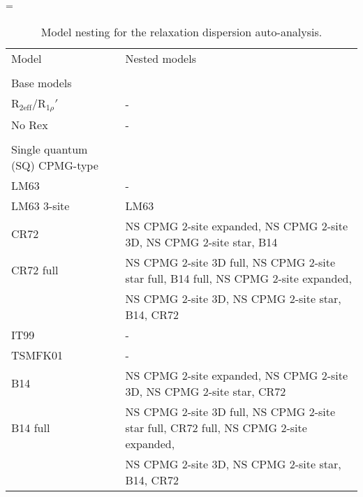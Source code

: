 \documentclass[a4paper,11pt,twoside,openright]{book}
\makeatletter
\let\realnormalsize=\normalsize
\def\liih@math{\ifmmode$\else\bad@math\fi}
\def\adjustnormalsize{\def\normalsize{\mathsurround=0pt \realnormalsize
 \parindent=0pt\abovedisplayskip=0pt\belowdisplayskip=0pt}%
 \def\phantompar{\csname par\endcsname}\normalsize}%
\newcommand\lthtmlvboxmathA{\adjustnormalsize\setbox\sizebox=\vbox\bgroup %
 \let\ifinner=\iffalse \let\)\liih@math }%
\newcommand\lthtmlmathtype[1]{\gdef\lthtmlmathenv{#1}}%
\newcommand\lthtmlfigureA[1]{\let\@savefreelist\@freelist
       \lthtmlmathtype{#1}\lthtmlvboxmathA}%
\makeatother
\begin{document}
{\newpage\clearpage
\lthtmlfigureA{landscape11746}%
\begin{landscape}

\begin{center}
\begin{small}
\par
\begin{longtable}{ll}
\par
\caption{Model nesting for the relaxation dispersion auto-analysis.}
\par
\\
\toprule
Model & Nested models\footnotemark [1]\\
\midrule
\endhead
\par
\bottomrule
\endfoot
\par
\par
\\[-5pt]
Base models \\
\cline{1-1}
$\mathrm{R}_{\textrm{2eff}}/\mathrm{R}_{1\rho}'$\          & - \\
No Rex                           & - \\
\par
\\[-5pt]
Single quantum (SQ) CPMG-type \\
\cline{1-1}
LM63                             & - \\
LM63 3-site                      & LM63 \\
CR72                             & NS CPMG 2-site expanded, NS CPMG 2-site 3D, NS CPMG 2-site star, B14 \\
CR72 full                        & NS CPMG 2-site 3D full, NS CPMG 2-site star full, B14 full, NS CPMG 2-site expanded, \\
                                 & NS CPMG 2-site 3D, NS CPMG 2-site star, B14, CR72 \\
IT99                             & - \\
TSMFK01                          & - \\
B14                              & NS CPMG 2-site expanded, NS CPMG 2-site 3D, NS CPMG 2-site star, CR72 \\
B14 full                         & NS CPMG 2-site 3D full, NS CPMG 2-site star full, CR72 full, NS CPMG 2-site expanded, \\
                                 & NS CPMG 2-site 3D, NS CPMG 2-site star, B14, CR72 \\

\end{longtable}
\end{small}
\end{center}
\end{landscape}}
\end{document}
